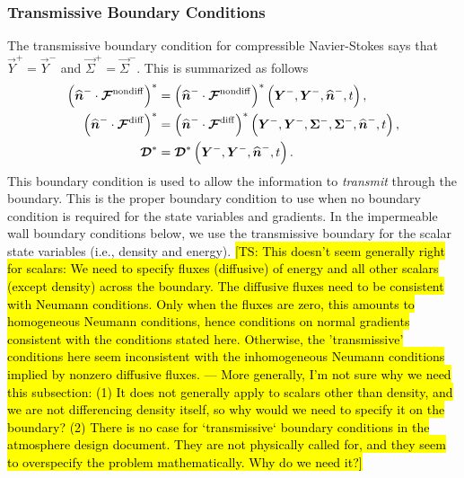 \documentclass{report}
\begin{document}
\subsubsection{Transmissive Boundary Conditions}
The transmissive boundary condition for compressible Navier-Stokes says
that $\vec{Y}^{+} = \vec{Y}^{-}$ and $\vec{\Sigma}^{+} = \vec{\Sigma}^{-}$. 
This is summarized as follows
\begin{align}
  {\left( \widehat{\boldsymbol{{n}}}^{-} \cdot \boldsymbol{{\mathcal{F}}}^{\mathrm{nondiff}}\right)}^{*} &=
  {\left( \widehat{\boldsymbol{{n}}}^{-} \cdot \boldsymbol{{\mathcal{F}}}^{\mathrm{nondiff}}\right)}^{*}
  \left(\boldsymbol{{Y}}^{-}, \boldsymbol{{Y}}^{-}, \widehat{\boldsymbol{{n}}}^{-}, t\right),\\
  {\left( \widehat{\boldsymbol{{n}}}^{-} \cdot \boldsymbol{{\mathcal{F}}}^{\mathrm{diff}}\right)}^{*} &=
  {\left( \widehat{\boldsymbol{{n}}}^{-} \cdot \boldsymbol{{\mathcal{F}}}^{\mathrm{diff}}\right)}^{*}
  \left(\boldsymbol{{Y}}^{-}, \boldsymbol{{Y}}^{-}, \boldsymbol{{\Sigma}}^{-}, \boldsymbol{{\Sigma}}^{-},
  \widehat{\boldsymbol{{n}}}^{-}, t\right),\\
  \boldsymbol{{\mathcal{D}}}^{*} &=
  \boldsymbol{{\mathcal{D}}}^{*}
  \left(\boldsymbol{{Y}}^{-}, \boldsymbol{{Y}}^{-}, \widehat{\boldsymbol{{n}}}^{-}, t\right).
\end{align}
This boundary condition is used to allow the information to \emph{transmit} through the boundary.  
This is the proper boundary condition to use when no boundary condition is required for the state variables and gradients. In the impermeable wall boundary conditions below, we use the transmissive boundary for the scalar state variables (i.e., density and energy). \hl{[TS: This doesn't seem generally right for scalars: We need to specify fluxes (diffusive) of energy and all other scalars (except density) across the boundary. The diffusive fluxes need to be consistent with Neumann conditions. Only when the fluxes are zero, this amounts to homogeneous Neumann conditions, hence conditions on normal gradients consistent with the conditions stated here. Otherwise, the 'transmissive' conditions here seem inconsistent with the inhomogeneous  Neumann conditions implied by nonzero diffusive fluxes. --- More generally, I'm not sure why we need this subsection: (1) It does not generally apply to scalars other than density, and we are not differencing density itself, so why would we need to specify it on the boundary? (2) There is no case for `transmissive` boundary conditions in the atmosphere design document. They are not physically called for, and they seem to overspecify the problem mathematically. Why do we need it?]}
\end{document}
